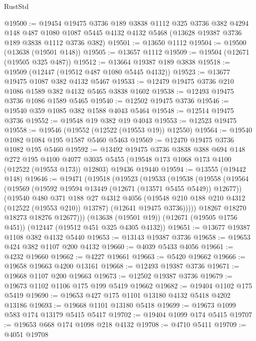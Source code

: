 \begin{lexlean}{RustStd}
\begin{coremodule}
@19500 := @19454
    @19475
    @3736
    @189
    @3838
    @1112
    @325
    @3736
    @382
    @4294
    @148
    @487
    @1080
    @1087
    @5445
    @4132
    @4132
    @5468
    (@13628 @19387 @3736 @189 @3838 @1112 @3736 @382)
@19501 := @13650 @1112
@19504 := @19500 (@13638 (@19501 @148))
@19505 := @13657 @1112
@19509 := @19504 (@12671 (@19505 @325 @487))
@19512 := @13664 @19387 @189 @3838
@19518 := @19509 (@12447 (@19512 @487 @1080 @5445 @4132))
@19523 := @13677 @19475 @1087 @382 @4132 @5467
@19533 := @12479 @19475 @3736 @210 @1086 @1589 @382 @4132 @5465 @3838 @1602
@19538 := @12493 @19475 @3736 @1086 @1589 @5465
@19540 := @12502 @19475 @3736
@19546 := @19540 @359 @1085 @382 @1588 @4043 @5464
@19548 := @12514 @19475 @3736
@19552 := @19548 @19 @382 @19 @4043
@19553 := @12523 @19475
@19558 := @19546 (@19552 (@12522 (@19553 @19)) @12550)
@19564 := @19540 @1082 @1084 @195 @1587 @5460 @5463
@19569 := @12470 @19475 @3736 @1082 @195 @5460
@19592 := @13492
    @19475
    @3736
    @3838
    @388
    @694
    @148
    @272
    @195
    @4100
    @4077
    @3035
    @5455
    (@19548 @173 @1068 @173 @4100 (@12522 (@19553 @173)) @12803)
    @19436
    @19440
@19594 := @13555 (@19442 @148)
@19646 := @19471
    (@19518
      (@19523
        (@19533
          (@19538
            (@19558
              (@19564
                (@19569 (@19592 @19594 @13449 (@12671 (@13571 @5455 @5449)) @12677))
                (@19540
                  @480
                  @371
                  @188
                  @27
                  @4312
                  @4056
                  (@19548 @210 @188 @210 @4312 (@12522 (@19553 @210)) @13787)
                  (@12641 @19475 @3736)))))
          @18267
          @18270
          @18273
          @18276
          @12677)))
    (@13638 (@19501 @19))
    (@12671 (@19505 @1756 @451))
    (@12447 (@19512 @451 @325 @4305 @4132))
@19651 := @13677 @19387 @1108 @382 @4132 @5440
@19653 := @13143 @19387 @3736
@19658 := @19653 @424 @382 @1107 @200 @4132
@19660 := @4039 @5433 @4056
@19661 := @4232 @19660
@19662 := @4227 @19661
@19663 := @5420 @19662
@19666 := @19658 @19663 @4200 @13161
@19668 := @12493 @19387 @3736
@19671 := @19668 @1107 @200 @19663
@19673 := @12502 @19387 @3736
@19679 := @19673 @1102 @1106 @175 @199 @5419 @19662
@19682 := @19404 @1102 @175 @5419
@19690 := @19653 @427 @175 @1101 @13180 @4132 @5418 @4202 @13186
@19693 := @19668 @1101 @13180 @5418
@19699 := @19673 @1099 @583 @174 @13179 @5415 @5417
@19702 := @19404 @1099 @174 @5415
@19707 := @19653 @668 @174 @1098 @218 @4132
@19708 := @4710 @5411
@19709 := @4051 @19708

\end{coremodule}
\end{lexlean}
